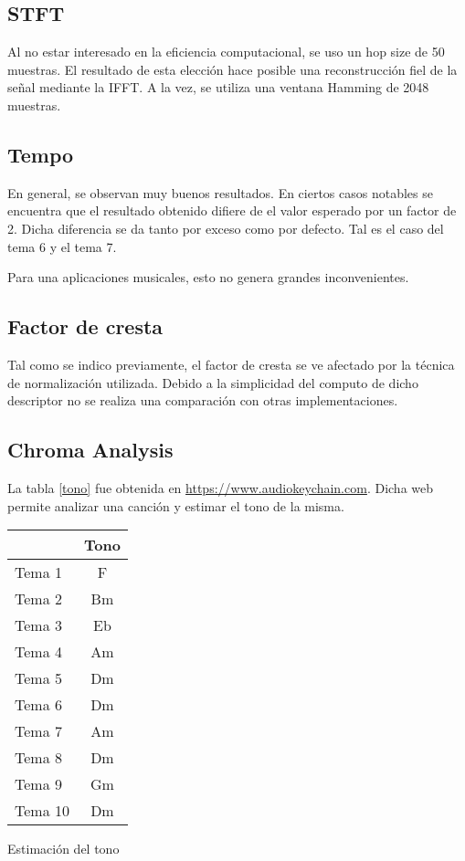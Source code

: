\documentclass[]{article}
\makeatletter
\newcommand{\tabla}[4]{
\begin{tablehere}
\begin{center}
\begin{tabular}{#1}
#2
\end{tabular}
\caption{#3}
\label{#4}
\end{center}
\end{tablehere}
}
\newenvironment{tablehere}    %
  {\def\@captype{table}}    %

  {}              %
\makeatother
\begin{document}
\begin{multicols}{2}
\subsection{STFT}
Al no estar interesado en la eficiencia computacional, se uso un hop size de 50
muestras. El resultado de esta elección
hace posible una reconstrucción fiel de la señal mediante la IFFT. A la vez, se
utiliza una ventana Hamming de 2048 muestras.
\subsection{Tempo}
En general, se observan muy buenos resultados. En ciertos casos notables
se encuentra que el resultado obtenido difiere de el valor esperado por un factor
de 2. Dicha diferencia se da tanto por exceso como por defecto.
Tal es el caso del tema 6 y el tema 7.

Para una aplicaciones musicales,
esto no genera grandes inconvenientes.

\subsection{Factor de cresta}
Tal como se indico previamente, el factor de cresta se ve afectado por la técnica
de normalización utilizada. Debido a la simplicidad del computo de dicho descriptor
no se realiza una comparación con otras implementaciones.
\subsection{Chroma Analysis}
La tabla \ref{tono} fue obtenida en \url{https://www.audiokeychain.com}.
Dicha web permite analizar una canción y estimar el tono de la misma.

\tabla
{|l|c|}
{
\hline
 & Tono      \\
 \hline
Tema 1  & F  \\
\hline
Tema 2  & Bm \\
\hline
Tema 3  & Eb \\
\hline
Tema 4  & Am \\
\hline
Tema 5  & Dm \\
\hline
Tema 6  & Dm \\
\hline
Tema 7  & Am \\
\hline
Tema 8  & Dm \\
\hline
Tema 9  & Gm \\
\hline
Tema 10  & Dm \\
\hline
}
{Estimación del tono}
{tono}


\end{multicols}
\end{document}
